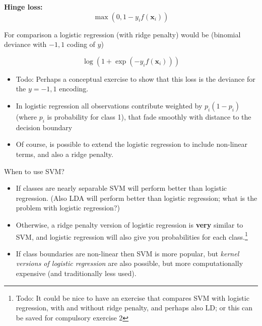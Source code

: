 \documentclass[10pt,ignorenonframetext,]{beamer}
\begin{document}
\begin{frame}

\textbf{Hinge loss:} \[\max(0,1-y_if({\boldsymbol x}_i))\]

For comparison a logistic regression (with ridge penalty) would be
(binomial deviance with \(-1,1\) coding of \(y\))

\[ \log(1+\exp(-y_i f({\boldsymbol x}_i)))\]

\begin{itemize}
\item
  Todo: Perhaps a conceptual exercise to show that this loss is the
  deviance for the \(y=-1,1\) encoding.
\item
  In logistic regression all observations contribute weighted by
  \(p_i(1-p_i)\) (where \(p_i\) is probability for class 1), that fade
  smoothly with distance to the decision boundary
\item
  Of course, is possible to extend the logistic regression to include
  non-linear terms, and also a ridge penalty.
\end{itemize}

\end{frame}

\begin{frame}

\begin{block}{When to use SVM?}

\begin{itemize}
\item
  If classes are nearly separable SVM will perform better than logistic
  regression. (Also LDA will perform better than logistic regression;
  what is the problem with logistic regression?)
\item
  Otherwise, a ridge penalty version of logistic regression is
  \textbf{very} similar to SVM, and logistic regression will also give
  you probabilities for each
  class.\footnote{Todo: It could be nice to have an exercise that compares SVM with logistic regression, with and without ridge penalty, and perhaps also LD; or this can be saved for compulsory exercise 2}
\item
  If class boundaries are non-linear then SVM is more popular, but
  \emph{kernel versions of logistic regression} are also possible, but
  more computationally expensive (and traditionally less used).
\end{itemize}

\end{block}

\end{frame}
\end{document}

